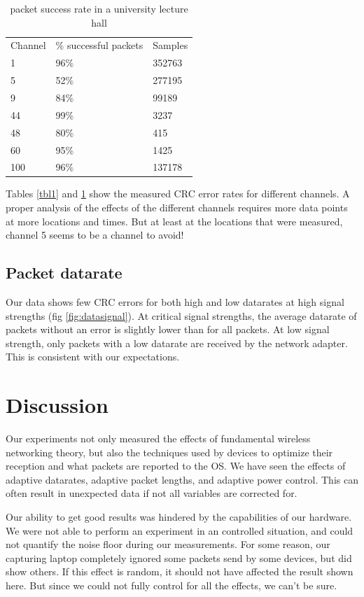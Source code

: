 \documentclass{IEEEtran}
\begin{document}
\begin{table}[h]\centering
\caption{packet success rate in a university lecture hall}
\label{tbl2}
\begin{tabular}{lll}
Channel & \% successful packets & Samples \\
1       & 96\%                          & 352763  \\
5       & 52\%                          & 277195  \\
9       & 84\%                          & 99189   \\
44      & 99\%                          & 3237   \\
48      & 80\%                          & 415    \\
60      & 95\%                          & 1425   \\
100     & 96\%                          & 137178 \\
\end{tabular}
\end{table}

Tables \ref{tbl1} and \ref{tbl2} show the measured CRC error rates for different channels. A proper analysis of the effects of the different channels requires more data points at more locations and times. But at least at the locations that were measured, channel 5 seems to be a channel to avoid!

\subsection{Packet datarate}
Our data shows few CRC errors for both high and low datarates at high signal strengths (fig \ref{fig:datasignal}). At critical signal strengths, the average datarate of packets without an error is slightly lower than for all packets. At low signal strength, only packets with a low datarate are received by the network adapter. This is consistent with our expectations.

\section{Discussion}
Our experiments not only measured the effects of fundamental wireless networking theory, but also the techniques used by devices to optimize their reception and what packets are reported to the OS. We have seen the effects of adaptive datarates, adaptive packet lengths, and adaptive power control. This can often result in unexpected data if not all variables are corrected for.  

Our ability to get good results was hindered by the capabilities of our hardware. We were not able to perform an experiment in an controlled situation, and could not quantify the noise floor during our measurements. For some reason, our capturing laptop completely ignored some packets send by some devices, but did show others. If this effect is random, it should not have affected the result shown here. But since we could not fully control for all the effects, we can't be sure.


\printbibliography
\end{document}
